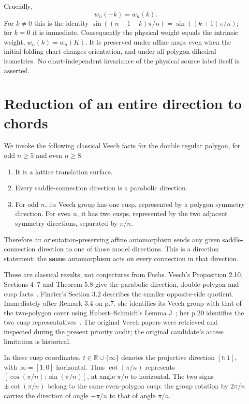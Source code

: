\documentclass[11pt]{article}
\begin{document}
Crucially,
\[
w_n(-k)=w_n(k).
\tag{10}
\]
For \(k\ne0\) this is the identity
\(\sin((n-1-k)\pi/n)=\sin((k+1)\pi/n)\); for \(k=0\) it is immediate. Consequently the physical weight equals the intrinsic weight, \(w_n(k)=w_n(K)\). It is preserved under affine maps even when the initial folding chart changes orientation, and under all polygon dihedral isometries. No chart-independent invariance of the physical source label itself is asserted.

\section{Reduction of an entire direction to chords}

We invoke the following classical Veech facts for the double regular polygon, for odd \(n\ge5\) and even \(n\ge8\):

\begin{enumerate}
\item It is a lattice translation surface.
\item Every saddle-connection direction is a parabolic direction.
\item For odd \(n\), its Veech group has one cusp, represented by a polygon symmetry direction. For even \(n\), it has two cusps, represented by the two adjacent symmetry directions, separated by \(\pi/n\).

\end{enumerate}
Therefore an orientation-preserving affine automorphism sends any given saddle-connection direction to one of those model directions. This is a direction statement: the \textbf{same} automorphism acts on every connection in that direction.

These are classical results, not conjectures from Fuchs. Veech's Proposition 2.10, Sections 4--7 and Theorem 5.8 give the parabolic direction, double-polygon and cusp facts~\cite{Veech}. Finster's Section 3.2 describes the smaller opposite-side quotient. Immediately after Remark 3.4 on p.7, she identifies its Veech group with that of the two-polygon cover using Hubert--Schmidt's Lemma J~\cite{HubertSchmidt}; her p.20 identifies the two cusp representatives~\cite{Finster}. The original Veech papers were retrieved and inspected during the present priority audit; the original candidate's access limitation is historical.

In these cusp coordinates, \(t\in\mathbb R\cup\{\infty\}\) denotes the projective direction \([t:1]\), with \(\infty=[1:0]\) horizontal. Thus \(\cot(\pi/n)\) represents \([\cos(\pi/n):\sin(\pi/n)]\), at angle \(\pi/n\) to horizontal. The two signs \(\pm\cot(\pi/n)\) belong to the same even-polygon cusp: the group rotation by \(2\pi/n\) carries the direction of angle \(-\pi/n\) to that of angle \(\pi/n\).
\end{document}
